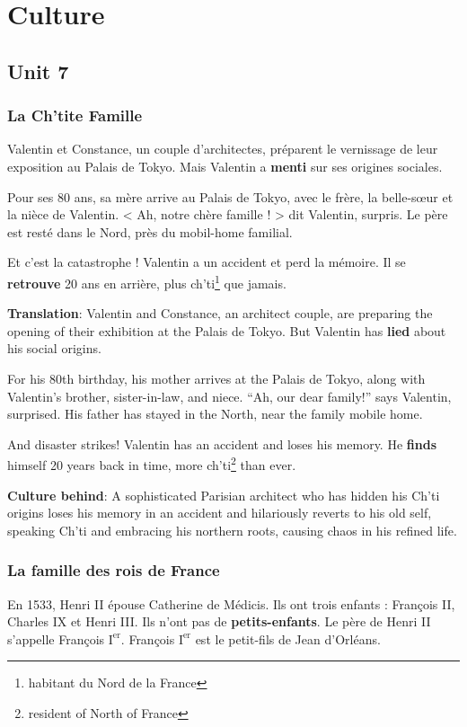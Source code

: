\documentclass[math,code]{amznotes}
\theoremstyle{remark}
\begin{document}
\chapter{Culture}
\section*{Unit 7}
\subsection*{La Ch'tite Famille}
Valentin et Constance, un couple d'architectes, préparent le vernissage de leur exposition au Palais de Tokyo. Mais Valentin a \textbf{menti} sur ses origines sociales.

Pour ses 80 ans, sa mère arrive au Palais de Tokyo, avec le frère, la belle-sœur et la nièce de Valentin. < Ah, notre chère famille ! > dit Valentin, surpris. Le père est resté dans le Nord, près du mobil-home familial.

Et c'est la catastrophe ! Valentin a un accident et perd la mémoire. Il se \textbf{retrouve} 20 ans en arrière, plus ch'ti\footnote{habitant du Nord de la France} que jamais.

\textbf{Translation}:
Valentin and Constance, an architect couple, are preparing the opening of their exhibition at the Palais de Tokyo. But Valentin has \textbf{lied} about his social origins.

For his 80th birthday, his mother arrives at the Palais de Tokyo, along with Valentin's brother, sister-in-law, and niece. ``Ah, our dear family!'' says Valentin, surprised. His father has stayed in the North, near the family mobile home.

And disaster strikes! Valentin has an accident and loses his memory. He \textbf{finds} himself 20 years back in time, more ch'ti\footnote{resident of North of France} than ever.

\textbf{Culture behind}: A sophisticated Parisian architect who has hidden his Ch’ti origins loses his memory in an accident and hilariously reverts to his old self, speaking Ch’ti and embracing his northern roots, causing chaos in his refined life.

\subsection*{La famille des rois de France}
En 1533, Henri II épouse Catherine de Médicis. Ils ont trois enfants : François II, Charles IX et Henri III. Ils n'ont pas de \textbf{petits-enfants}. Le père de Henri II s'appelle François $\text{I}^{\text{er}}$. François $\text{I}^{\text{er}}$ est le petit-fils de Jean d'Orléans.
\end{document}
